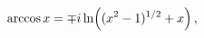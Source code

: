 \[\mathop{\mathrm{arccos}\/}\nolimits x=\mp i\mathop{\ln\/}\nolimits\!\left((x^{%
2}-1)^{1/2}+x\right),\]